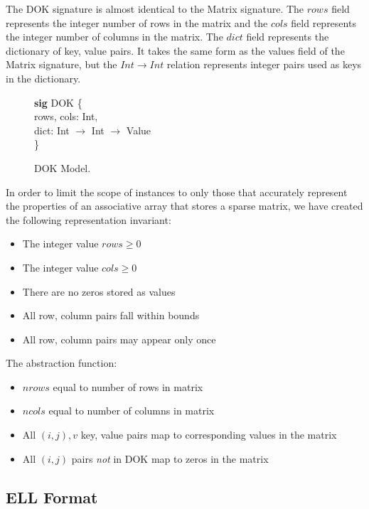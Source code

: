 \documentclass[11pt,conference]{IEEEtran}
\newenvironment{myquote}{\list{}{\leftmargin=12pt\rightmargin=0pt}\item[]}{\endlist}
\def\TA{\makebox[12pt]{}}
\def\Bsig{\textbf{sig} }
\begin{document}
The DOK signature is almost identical to the Matrix signature.  The \(rows\) field represents the integer number of rows in the matrix and the \(cols\) field represents the integer number of columns in the matrix.  The \(dict\) field represents the dictionary of key, value pairs.  It takes the same form as the values field of the Matrix signature, but the \(Int \to Int\) relation represents integer pairs used as keys in the dictionary.

\begin{figure}
\centering
\begin{myquote}
\Bsig DOK \{\\
\TA  rows, cols: Int,\\
\TA  dict: Int $\rightarrow$ Int $\rightarrow$ Value\\
\}
\end{myquote}
\caption{DOK Model.}
\label{model:dok}
\end{figure}

In order to limit the scope of instances to only those that accurately represent the properties of an associative array that stores a sparse matrix, we have created the following representation invariant:

\begin{itemize}
  \item The integer value \(rows \geq 0\)
  \item The integer value \(cols \geq 0\)
  \item There are no zeros stored as values
  \item All row, column pairs fall within bounds
  \item All row, column pairs may appear only once
\end{itemize}

The abstraction function:

\begin{itemize}
  \item \(nrows\) equal to number of rows in matrix
  \item \(ncols\) equal to number of columns in matrix
  \item All \((i, j), v\) key, value pairs map to corresponding values in the matrix
  \item All \((i, j)\) pairs \emph{not} in DOK map to zeros in the matrix
\end{itemize}

\subsection{ELL Format}
\end{document}
